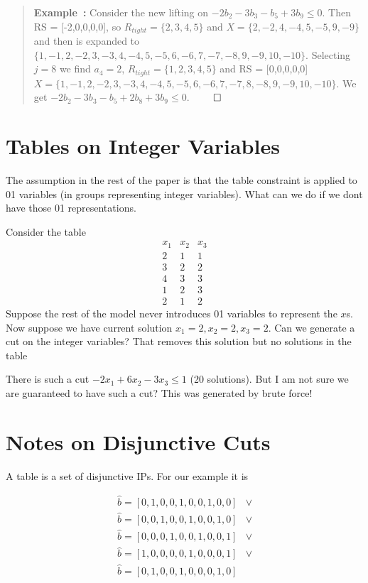 \documentclass{article}
\newcounter{excount}
\newenvironment{example}{\begin{quote}\refstepcounter{excount}\textbf{Example~\arabic{excount}:}}{\hfill$\qed$\end{quote}}
\begin{document}
\begin{example}
    Consider the new lifting on $-2 b_2 - 3b_3 -b_5 + 3b_9 \leq 0$. Then RS = [-2,0,0,0,0], so $R_{tight} = \{2,3,4,5\}$ and $X = \{ 2,-2,4,-4,5,-5,9,-9\}$ and
    then is expanded to $\{1,-1,2,-2,3,-3,4,-4,5,-5,6,-6,7,-7,-8,9,-9,10,-10\}$. 
    Selecting $j = 8$ we find $a_4 = 2$, $R_{tight} = \{1,2,3,4,5\}$ and RS = [0,0,0,0,0]
    $X = \{ 1,-1,2,-2,3,-3,4,-4,5,-5,6,-6,7,-7,8,-8,9,-9,10,-10\}$. We get 
    $-2b_2 -3b_3 - b_5 + 2b_8 + 3b_9 \leq 0$.
\end{example}


\section{Tables on Integer Variables}

The assumption in the rest of the paper is that the table constraint is applied to 01 variables (in groups representing integer variables). What can we do if we dont have those 01 representations.

Consider the table
$$
\begin{array}{rrr}
x_1 & x_2 & x_3 \\ \hline
2 & 1 & 1 \\
3 & 2 & 2 \\
4 & 3 & 3 \\
1 & 2 & 3 \\
2 & 1 & 2 
\end{array}
$$
Suppose the rest of the model never introduces 01 variables to represent the $x$s.
Now suppose we have current solution $x_1 = 2, x_2 = 2, x_3 = 2$. Can we generate a cut on the integer variables? That removes this solution but no solutions in the table

There is such a cut
$-2 x_1 + 6 x_2 - 3 x_3 \leq 1$ (20 solutions).
But I am not sure we are guaranteed to have such a cut?
This was generated by brute force!


\section{Notes on Disjunctive Cuts}

A table is a set of disjunctive IPs. For our example it is

$$
\begin{array}{rl}
\hat{b} = [0,1,0,0,1,0,0,1,0,0] & \vee \\
\hat{b} = [0,0,1,0,0,1,0,0,1,0] & \vee \\
\hat{b} = [0,0,0,1,0,0,1,0,0,1] & \vee \\
\hat{b} = [1,0,0,0,0,1,0,0,0,1] & \vee \\
\hat{b} = [0,1,0,0,1,0,0,0,1,0] &  \\
\end{array}
$$
\end{document}
